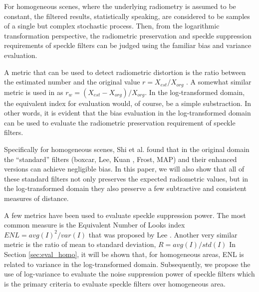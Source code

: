 \documentclass[journal]{IEEEtran}
\begin{document}
For homogeneous scenes, 
	where the underlying radiometry is assumed to be constant, 
	the filtered results, statistically speaking, are considered to be samples of 
		a single but complex stochastic process.
Then, from the logarithmic transformation perspective, the radiometric preservation and speckle suppression requirements of speckle filters can be judged using the familiar bias and variance evaluation.

A metric that can be used to detect radiometric distortion is the ratio between the estimated number and the original value $r = X_{est} / X_{org}$ \cite{Oliver_2004_SciTech} \cite{Medeiros_2003_IJRS}.
A somewhat similar metric is used in \cite{Wang_2005_MIPR} as $r_w = (X_{est} - X_{org} )/ X_{org}$.
In the log-transformed domain, the equivalent index for evaluation would, of course, be a simple substraction.
In other words, it is evident that the bias evaluation in the log-transformed domain can be used to evaluate the radiometric preservation requirement of speckle filters. 

Specifically for homogeneous scenes, Shi et al. \cite{Shi_IGARSS_1994} found that 
	in the original domain the ``standard'' filters (boxcar, Lee\cite{Lee_PAMI_1980}, Kuan \cite{Kuan_1985_PAMI}, Frost\cite{Frost_PAMI_1982}, MAP\cite{Lopes_IGARSS_1990}) and their enhanced versions \cite{Lopes_TGRS_1990} can achieve negligible bias. 
In this paper, we will also show that all of these standard filters 
	not only preserves the expected radiometric values, 
	but in the log-transformed domain they also preserve a few subtractive and consistent measures of distance.

A few metrics have been used to evaluate speckle suppression power.
The most common measure is the Equivalent Number of Looks index 
$ENL=avg(I)^2/var(I)$
that was proposed by Lee \cite{Lee_1981_CGIP}.
Another very similar metric is the ratio of mean to standard deviation, $R=avg(I)/std(I)$ \cite{Gagnon_SPIEProc_1997} 
In Section \ref{sec:eval_homo}, it will be shown that, for homogeneous areas, ENL is related to variance in the log-transformed domain.
Subsequently, we propose the use of log-variance to evaluate the noise suppression power of speckle filters which is the primary criteria to evaluate speckle filters over homogeneous area.
\end{document}
